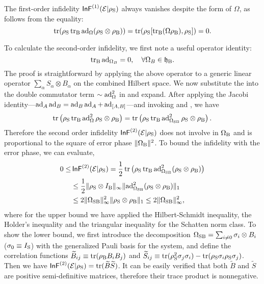 \documentclass[aps,pra,reprint,superscriptaddress]{revtex4-2}
\begin{document}
The first-order infidelity  $\operatorname{\mathsf{InF}}^{(1)}(\mathcal{E}|\rho_{\mathrm{S}})$ always vanishes 
despite the form of $\Omega$, as follows from the equality:
\begin{equation}\label{eq:1st-infid}
\operatorname{tr}(\rho_\mathrm{S} \operatorname{\operatorname{tr}_\mathrm{B}} \operatorname{ad}_\Omega(\rho_{\mathrm{S}} \otimes\rho_{\mathrm{B}}))= \operatorname{tr}(\rho_\mathrm{S}[\operatorname{\operatorname{tr}_\mathrm{B}} (\Omega \rho_{\mathrm{B}}),\rho_{\mathrm{S}}])=0.
\end{equation}

To calculate the second-order infidelity, we first note a useful operator identity:
\begin{equation}\label{eq:trBad}
    \operatorname{\operatorname{tr}_\mathrm{B}} \operatorname{ad}_{\Omega_B} = 0,\quad \forall \Omega_B \in \mathfrak{h}_{\mathrm{B}}.
\end{equation}
The proof is straightforward by applying the above operator to a generic linear operator $\sum_\alpha S_\alpha \otimes B_\alpha$ on the combined Hilbert space.
We now substitute the  into the double commutator term $\sim\operatorname{ad}_{\Omega}^2$ in   and expand. After applying
the Jacobi identity---$\operatorname{ad}_{A}\operatorname{ad}_{B}=\operatorname{ad}_{B}\operatorname{ad}_{A}+\operatorname{ad}_{[A,B]}$---and invoking
  and , we have
\begin{equation}
\operatorname{tr}\left( \rho_{\mathrm{S}} \operatorname{\operatorname{tr}_\mathrm{B}} \operatorname{ad}^2_{\Omega} \rho_{\mathrm{S}}\otimes\rho_{\mathrm{B}}\right) =  \operatorname{tr}\left( \rho_{\mathrm{S}} \operatorname{\operatorname{tr}_\mathrm{B}} \operatorname{ad}^2_{\Omega_{\mathrm{SB}}} \rho_{\mathrm{S}}\otimes\rho_{\mathrm{B}}\right).
\end{equation}
Therefore the second order infidelity $\operatorname{\mathsf{InF}}^{(2)}(\mathcal{E}|\rho_{\mathrm{S}})$ does not involve in $\Omega_{\mathrm{B}}$ and is proportional to the square of error phase $\Vert {\Omega_{\mathrm{B}}} \Vert^2$.
To bound the infidelity with the error phase, we can evaluate,
\begin{equation}\label{eq:infid2-bound}
\begin{aligned}
    0\le& \operatorname{\mathsf{InF}}^{(2)}(\mathcal{E}|\rho_{\mathrm{S}}) =   \frac{1}{2}  \operatorname{tr}\left( \rho_{\mathrm{S}} \operatorname{\operatorname{tr}_\mathrm{B}} \operatorname{ad}^2_{\Omega_{\mathrm{SB}}}(\rho_{\mathrm{S}}\otimes\rho_{\mathrm{B}})\right)\\
&\le \frac{1}{2}\Vert {\rho_\mathrm{S}\otimes I_{\mathrm{B}}} \Vert_\infty \Vert {\operatorname{ad}^2_{\Omega_{\mathrm{SB}}} (\rho_{\mathrm{S}}\otimes\rho_{\mathrm{B}})} \Vert_1\\
&\le 2 \Vert {\Omega_{\mathrm{SB}}} \Vert_\infty^2 \Vert {\rho_\mathrm{S}\otimes\rho_\mathrm{B}} \Vert_1 \le 2\Vert {\Omega_{\mathrm{SB}}} \Vert_\infty^2,
\end{aligned}   
\end{equation}
where for the upper bound we have applied the Hilbert-Schmidt inequality, the Holder's inequality and the triangular inequality for the Schatten norm class.
To show the lower bound, we first introduce the decomposition $\Omega_{\mathrm{SB}} = \sum_{i\neq 0}\sigma_i \otimes B_i$  ($\sigma_0\equiv I_{\mathrm{S}}$) with the generalized Pauli basis for the system, and define the correlation functions 
$\widetilde{B}_{ij} \equiv \operatorname{tr}(\rho_{\mathrm{B}} B_i B_j)$ and $\widetilde{S}_{ij} \equiv \operatorname{tr}(\rho_\mathrm{S}^2 \sigma_j\sigma_i) -\operatorname{tr}(\rho_\mathrm{S} \sigma_i \rho_\mathrm{S} \sigma_j)$. 
Then we have $\operatorname{\mathsf{InF}}^{(2)}(\mathcal{E}|\rho_{\mathrm{S}}) = \operatorname{tr}(\widetilde{B} \widetilde{S})$.
It can be easily verified that both $\widetilde{B}$ and $\widetilde{S}$ are positive semi-definitive matrices, therefore their trace product is nonnegative.
\end{document}
